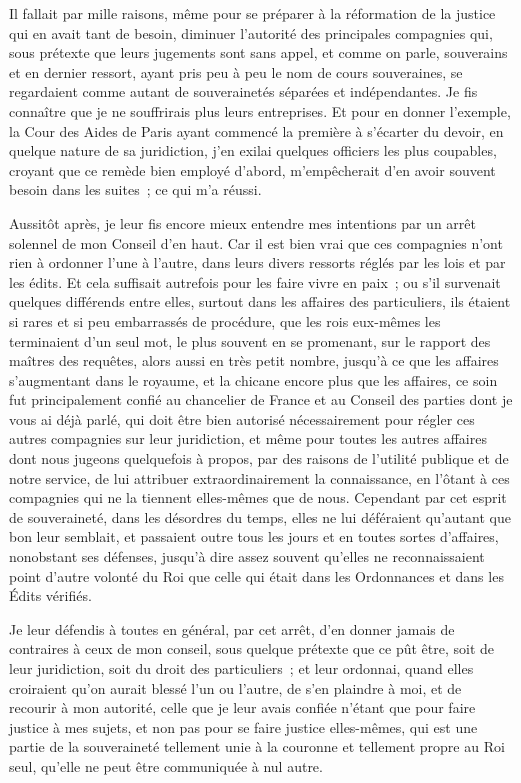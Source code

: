\documentclass[french,twoside]{book} %
\begin{document}
Il fallait par mille raisons, même pour se préparer à la réformation de la justice qui en avait tant de besoin, diminuer l’autorité des principales compagnies qui, sous prétexte que leurs jugements sont sans appel, et comme on parle, souverains et en dernier ressort, ayant pris peu à peu le nom de cours souveraines, se regardaient comme autant de souverainetés séparées et indépendantes. Je fis connaître que je ne souffrirais plus leurs entreprises. Et pour en donner l’exemple, la Cour des Aides de Paris ayant commencé la première à s’écarter du devoir, en quelque nature de sa juridiction, j’en exilai quelques officiers les plus coupables, croyant que ce remède bien employé d’abord, m’empêcherait d’en avoir souvent besoin dans les suites ; ce qui m’a réussi.\par
Aussitôt après, je leur fis encore mieux entendre mes intentions par un arrêt solennel de mon Conseil d’en haut. Car il est bien vrai que ces compagnies n’ont rien à ordonner l’une à l’autre, dans leurs divers ressorts réglés par les lois et par les édits. Et cela suffisait autrefois pour les faire vivre en paix ; ou s’il survenait quelques différends entre elles, surtout dans les affaires des particuliers, ils étaient si rares et si peu embarrassés de procédure, que les rois eux-mêmes les terminaient d’un seul mot, le plus souvent en se promenant, sur le rapport des maîtres des requêtes, alors aussi en très petit nombre, jusqu’à ce que les affaires s’augmentant dans le royaume, et la chicane encore plus que les affaires, ce soin fut principalement confié au chancelier de France et au Conseil des parties dont je vous ai déjà parlé, qui doit être bien autorisé nécessairement pour régler ces autres compagnies sur leur juridiction, et même pour toutes les autres affaires dont nous jugeons quelquefois à propos, par des raisons de l’utilité publique et de notre service, de lui attribuer extraordinairement la connaissance, en l’ôtant à ces compagnies qui ne la tiennent elles-mêmes que de nous. Cependant par cet esprit de souveraineté, dans les désordres du temps, elles ne lui déféraient qu’autant que bon leur semblait, et passaient outre tous les jours et en toutes sortes d’affaires, nonobstant ses défenses, jusqu’à dire assez souvent qu’elles ne reconnaissaient point d’autre volonté du Roi que celle qui était dans les Ordonnances et dans les Édits vérifiés.\par
Je leur défendis à toutes en général, par cet arrêt, d’en donner jamais de contraires à ceux de mon conseil, sous quelque prétexte que ce pût être, soit de leur juridiction, soit du droit des particuliers ; et leur ordonnai, quand elles croiraient qu’on aurait blessé l’un ou l’autre, de s’en plaindre à moi, et de recourir à mon autorité, celle que je leur avais confiée n’étant que pour faire justice à mes sujets, et non pas pour se faire justice elles-mêmes, qui est une partie de la souveraineté tellement unie à la couronne et tellement propre au Roi seul, qu’elle ne peut être communiquée à nul autre.\par
\end{document}
